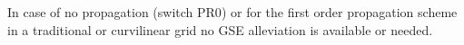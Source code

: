 
\vspace{\baselineskip}
\vspace{\baselineskip}


\noindent
In case of no propagation (switch {\code PR0}) or for the first order
propagation scheme in a traditional or curvilinear grid no GSE alleviation is
available or needed.